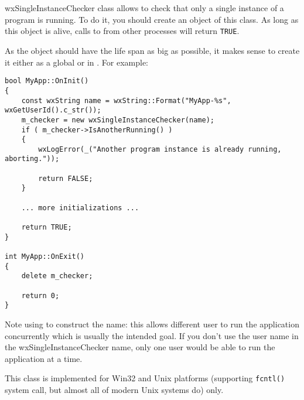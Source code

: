 
\section{}\label{wxsingleinstancechecker}

wxSingleInstanceChecker class allows to check that only a single instance of a
program is running. To do it, you should create an object of this class. As
long as this object is alive, calls to 
 from
other processes will return {\tt TRUE}.

As the object should have the life span as big as possible, it makes sense to
create it either as a global or in . For
example:

\begin{verbatim}
bool MyApp::OnInit()
{
    const wxString name = wxString::Format("MyApp-%s", wxGetUserId().c_str());
    m_checker = new wxSingleInstanceChecker(name);
    if ( m_checker->IsAnotherRunning() )
    {
        wxLogError(_("Another program instance is already running, aborting."));

        return FALSE;
    }

    ... more initializations ...

    return TRUE;
}

int MyApp::OnExit()
{
    delete m_checker;

    return 0;
}
\end{verbatim}

Note using  to construct the name: this
allows different user to run the application concurrently which is usually the
intended goal. If you don't use the user name in the wxSingleInstanceChecker
name, only one user would be able to run the application at a time.

This class is implemented for Win32 and Unix platforms (supporting {\tt fcntl()}
system call, but almost all of modern Unix systems do) only.

